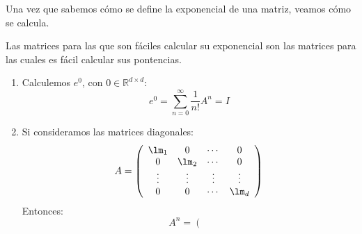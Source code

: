 \noindent
Una vez que sabemos cómo se define la exponencial de una matriz, veamos cómo se calcula. 

Las matrices para las que son fáciles calcular su exponencial son las matrices para las cuales es fácil calcular sus pontencias.
\begin{ejemplo}
    
    \begin{enumerate}
        \item 
    Calculemos $e^0$, con $0\in \mathbb{R}^{d\times d}$:
    \begin{equation*}
        e^0 = \sum_{n=0}^{\infty} \dfrac{1}{n!}A^n = I
    \end{equation*}

        \item  Si consideramos las matrices diagonales:
            \begin{equation*}
                A = \left(\begin{array}{cccc}
                        \lm_1 & 0 & \cdots & 0 \\
                        0 & \lm_2 & \cdots & 0 \\
                        \vdots & \vdots & \vdots & \vdots \\
                        0 & 0 & \cdots & \lm_d
                \end{array}\right)
            \end{equation*}
            Entonces:
            \begin{equation*}
                A^n = \left(\begin{array}{cccc}
                    

\end{array}
\end{equation*}
\end{enumerate}
\end{ejemplo}
